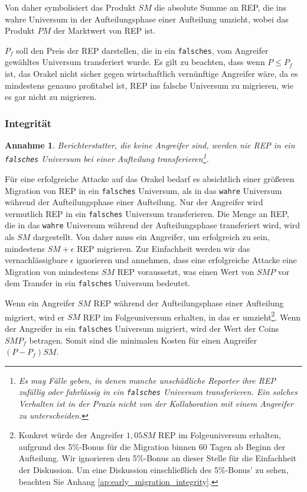 \documentclass[floatfix,reprint,nofootinbib,amsmath,amssymb,epsfig,pre,floats,letterpaper,groupedaffiliation]{revtex4-1}
\newtheorem{assumption}{Annahme}
\theoremstyle{definition}
\theoremstyle{definition}
\theoremstyle{definition}
\begin{document}
Von daher symbolisiert das Produkt $SM$ die absolute Summe an REP, die ins wahre Universum in der Aufteilungsphase einer Aufteilung umzieht, wobei das Produkt $PM$ der Marktwert von REP ist.

$P_f$ soll den Preis der REP darstellen, die in ein \texttt{falsches}, vom Angreifer gewähltes Universum transferiert wurde. Es gilt zu beachten, dass wenn $P \leq P_f$ ist, das Orakel nicht sicher gegen wirtschaftlich vernünftige Angreifer wäre, da es mindestens genauso profitabel ist, REP ins falsche Universum zu migrieren, wie es gar nicht zu migrieren.

\subsubsection{Integrität}

\begin{assumption}
Berichterstatter, die keine Angreifer sind, werden nie REP in ein \texttt{falsches} Universum bei einer Aufteilung transferieren\footnote{Es mag Fälle geben, in denen manche unschädliche Reporter ihre REP zufällig oder fahrlässig in ein \texttt{falsches} Universum transferieren. Ein solches Verhalten ist in der Praxis nicht von der Kollaboration mit einem Angreifer zu unterscheiden.}.
\end{assumption}

Für eine erfolgreiche Attacke auf das Orakel bedarf es absichtlich einer größeren Migration von REP in ein \texttt{falsches} Universum, als in das \texttt{wahre} Universum während der Aufteilungsphase einer Aufteilung. Nur der Angreifer wird vermutlich REP in ein \texttt{falsches} Universum transferieren. Die Menge an REP, die in das \texttt{wahre} Universum während der Aufteilungsphase transferiert wird, wird als $SM$ dargestellt. Von daher muss ein Angreifer, um erfolgreich zu sein, mindestens $SM + \epsilon$ REP migrieren. Zur Einfachheit werden wir das vernachlässigbare $\epsilon$ ignorieren und annehmen, dass eine erfolgreiche Attacke eine Migration von mindestens $SM$ REP voraussetzt, was einen Wert von $SMP$ vor dem Transfer in ein \texttt{falsches} Universum bedeutet.

Wenn ein Angreifer $SM$ REP während der Aufteilungsphase einer Aufteilung migriert, wird er $SM$ REP im Folgeuniversum erhalten, in das er umzieht\footnote{Konkret würde der Angreifer $1,05 SM$ REP im Folgeuniversum erhalten, aufgrund des 5\%-Bonus für die Migration binnen 60 Tagen ab Beginn der Aufteilung. Wir ignorieren den 5\%-Bonus an dieser Stelle für die Einfachheit der Diskussion. Um eine Diskussion einschließlich des 5\%-Bonus' zu sehen, beachten Sie Anhang \ref{ap:early_migration_integrity}.}. Wenn der Angreifer in ein \texttt{falsches} Universum migriert, wird der Wert der Coins $SMP_f$ betragen. Somit sind die minimalen Kosten für einen Angreifer $(P - P_f)SM$.
\end{document}
